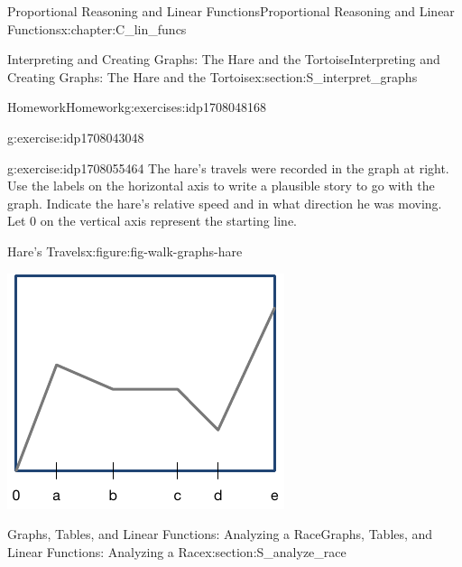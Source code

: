 \documentclass[oneside,10pt,]{book}
\numberwithin{equation}{chapter}
\begin{document}
\begin{chapterptx}{Proportional Reasoning and Linear Functions}{}{Proportional Reasoning and Linear Functions}{}{}{x:chapter:C_lin_funcs}
\begin{sectionptx}{Interpreting and Creating Graphs: The Hare and the Tortoise}{}{Interpreting and Creating Graphs: The Hare and the Tortoise}{}{}{x:section:S_interpret_graphs}
\begin{exercises-subsection}{Homework}{}{Homework}{}{}{g:exercises:idp1708048168}
\begin{divisionexercise}{1}{}{}{g:exercise:idp1708043048}
\begin{enumerate}[font=\bfseries,label=(\alph*),ref=\alph*]
%
\end{enumerate}
\end{divisionexercise}%
\begin{divisionexercise}{2}{}{}{g:exercise:idp1708055464}%
The hare's travels were recorded in the graph at right. Use the labels on the horizontal axis to write a plausible story to go with the graph. Indicate the hare's relative speed and in what direction he was moving. Let 0 on the vertical axis represent the starting line.%
\begin{figureptx}{Hare's Travels}{x:figure:fig-walk-graphs-hare}{}%
\begin{image}{0.25}{0.5}{0.25}%
\includegraphics[width=\linewidth]{external/exer-walk-graphs-hare.pdf}
\end{image}%
\tcblower
\end{figureptx}%
\end{divisionexercise}%
\end{exercises-subsection}
\end{sectionptx}
%
%
\typeout{************************************************}
\typeout{************************************************}
%
\begin{sectionptx}{Graphs, Tables, and Linear Functions: Analyzing a Race}{}{Graphs, Tables, and Linear Functions: Analyzing a Race}{}{}{x:section:S_analyze_race}
%
%
\typeout{************************************************}

\end{sectionptx}
\end{chapterptx}
\end{document}
